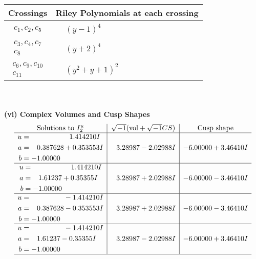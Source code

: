 \documentclass[1p]{elsarticle_modified}
\theoremstyle{definition}
\newcommand{\I}{\sqrt{-1}}
\begin{document}
\begin{tabular}{m{50pt}|m{274pt}}
Crossings & \hspace{64pt}Riley Polynomials at each crossing \\
\hline $$\begin{aligned}c_{1},c_{2},c_{5}\end{aligned}$$&$\begin{aligned}
&(y-1)^4
\end{aligned}$\\
\hline $$\begin{aligned}c_{3},c_{4},c_{7}\\c_{8}\end{aligned}$$&$\begin{aligned}
&(y+2)^4
\end{aligned}$\\
\hline $$\begin{aligned}c_{6},c_{9},c_{10}\\c_{11}\end{aligned}$$&$\begin{aligned}
&(y^2+y+1)^2
\end{aligned}$\\
\hline
\end{tabular}\\~\\
\newpage\flushleft \textbf{(vi) Complex Volumes and Cusp Shapes}
$$\begin{array}{c|c|c}  
\text{Solutions to }I^u_{2}& \I (\text{vol} + \sqrt{-1}CS) & \text{Cusp shape}\\
 \hline 
\begin{aligned}
u &= \phantom{-0.000000 -}1.414210 I \\
a &= \phantom{-}0.387628 + 0.353553 I \\
b &= -1.00000\phantom{ +0.000000I}\end{aligned}
 & \phantom{-}3.28987 - 2.02988 I & -6.00000 + 3.46410 I \\ \hline\begin{aligned}
u &= \phantom{-0.000000 -}1.414210 I \\
a &= \phantom{-}1.61237 + 0.35355 I \\
b &= -1.00000\phantom{ +0.000000I}\end{aligned}
 & \phantom{-}3.28987 + 2.02988 I & -6.00000 - 3.46410 I \\ \hline\begin{aligned}
u &= \phantom{-0.000000 } -1.414210 I \\
a &= \phantom{-}0.387628 - 0.353553 I \\
b &= -1.00000\phantom{ +0.000000I}\end{aligned}
 & \phantom{-}3.28987 + 2.02988 I & -6.00000 - 3.46410 I \\ \hline\begin{aligned}
u &= \phantom{-0.000000 } -1.414210 I \\
a &= \phantom{-}1.61237 - 0.35355 I \\
b &= -1.00000\phantom{ +0.000000I}\end{aligned}
 & \phantom{-}3.28987 - 2.02988 I & -6.00000 + 3.46410 I\\
 \hline 
 \end{array}$$\newpage\newpage\renewcommand{\arraystretch}{1}
\end{document}
